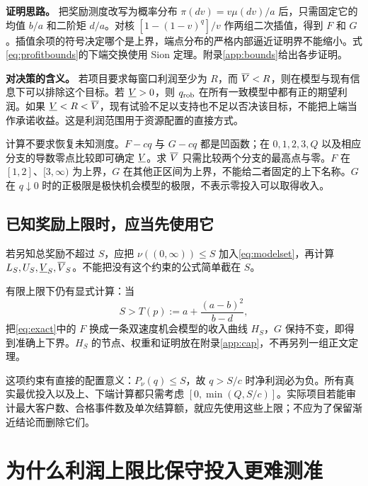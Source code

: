 \noindent\textbf{证明思路。}
把奖励测度改写为概率分布 $\pi(dv)=v\mu(dv)/a$ 后，只需固定它的均值 $b/a$ 和二阶矩 $d/a$。对核 $[1-(1-v)^q]/v$ 作两组二次插值，得到 $F$ 和 $G$。插值余项的符号决定哪个是上界，端点分布的严格内部逼近证明界不能缩小。式\eqref{eq:profitbounds}的下端交换使用 Sion 定理。附录\ref{app:bounds}给出各步证明。

\noindent\textbf{对决策的含义。}
若项目要求每窗口利润至少为 $R$，而 $\overline V<R$，则在模型与现有信息下可以排除这个目标。若 $\underline V>0$，则 $q_{\mathrm{rob}}$ 在所有一致模型中都有正的期望利润。如果 $\underline V<R<\overline V$，现有试验不足以支持也不足以否决该目标，不能把上端当作承诺收益。这是利润范围用于资源配置的直接方式。

计算不要求恢复未知测度。$F-cq$ 与 $G-cq$ 都是凹函数；在 $0,1,2,3,Q$ 以及相应分支的导数零点比较即可确定 $\underline V$。求 $\overline V$ 只需比较两个分支的最高点与零。$F$ 在 $[1,2]$、$[3,\infty)$ 为上界，$G$ 在其他正区间为上界，不能给二者固定的上下名称。$G$ 在 $q\downarrow0$ 时的正极限是极快机会模型的极限，不表示零投入可以取得收入。

\subsection{已知奖励上限时，应当先使用它}
若另知总奖励不超过 $S$，应把 $\nu((0,\infty))\leq S$ 加入\eqref{eq:modelset}，再计算 $L_S,U_S,\underline V_S,\overline V_S$。不能把没有这个约束的公式简单截在 $S$。

有限上限下仍有显式计算：当
\begin{equation}\label{eq:minmass}
 S>T(p):=a+\frac{(a-b)^2}{b-d},
\end{equation}
把\eqref{eq:exact}中的 $F$ 换成一条双速度机会模型的收入曲线 $H_S$，$G$ 保持不变，即得到准确上下界。$H_S$ 的节点、权重和证明放在附录\ref{app:cap}，不再另列一组正文定理。

这项约束有直接的配置意义：$P_\nu(q)\leq S$，故 $q>S/c$ 时净利润必为负。所有真实最优投入以及上、下端计算都只需考虑 $[0,\min(Q,S/c)]$。实际项目若能审计最大客户数、合格事件数及单次结算额，就应先使用这些上限；不应为了保留渐近结论而删除它们。

\section{为什么利润上限比保守投入更难测准}
